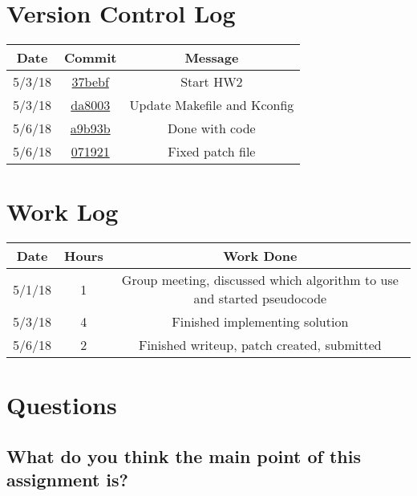 \documentclass[onecolumn, draftclsnofoot,10pt, compsoc]{IEEEtran}
\begin{document}
\section{Version Control Log}
\begin{center}
 \begin{tabular}{||c c c||} 
 \hline
 Date & Commit & Message \\ [0.5ex] 
 \hline\hline
 5/3/18 & \href{https://github.com/borkarr/cs544/commit/37bebf19cb4b92bad40f2cfc99ac1b254e8d1cbe}{37bebf} & Start HW2\\
 \hline
5/3/18 & \href{https://github.com/borkarr/cs544/commit/da8003ddb051b928d59c457e08bee968c06c5788}{da8003} & Update Makefile and Kconfig\\ 
 [1ex] 
 \hline
5/6/18 & \href{https://github.com/borkarr/cs544/commit/a9b93bcecb36ad7db8387eb7c2856b723ebbe25b}{a9b93b} & Done with code\\ 
 [1ex] 
\hline
5/6/18 & \href{https://github.com/borkarr/cs544/commit/0719214323154c06770925181ab1110277634b09}{071921} & Fixed patch file\\ 
 [1ex] 
 \hline
\end{tabular}
\end{center}

\section{Work Log}
\begin{center}
 \begin{tabular}{||c c c ||} 
 \hline
 Date & Hours&Work Done\\ [0.5ex] 
 \hline\hline
 5/1/18 & 1 & Group meeting, discussed which algorithm to use and started pseudocode
\\ 
 \hline
  5/3/18 & 4 & Finished implementing solution\\ 
 \hline
 5/6/18 & 2 & Finished writeup, patch created, submitted\\
 [1ex] 
 \hline
\end{tabular}
\end{center}
\section{Questions}
\subsection{What do you think the main point of this assignment is?}
\end{document}
